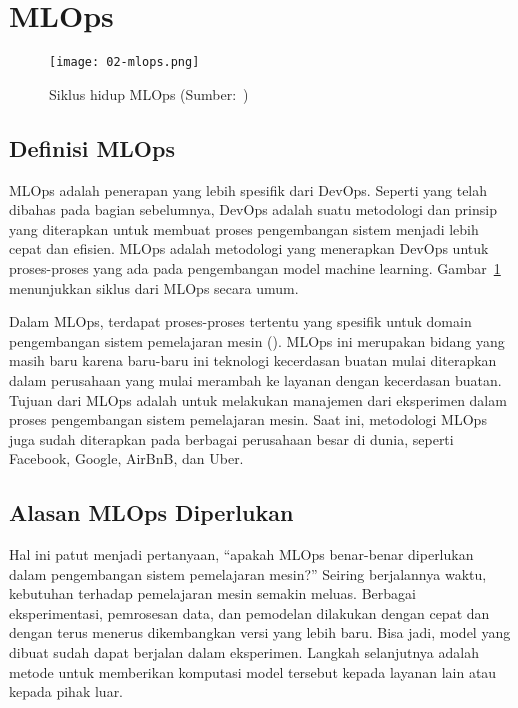 \section{MLOps}

\begin{figure}[ht]
  \vspace{\baselineskip}
  \centering
  \texttt{[image: 02-mlops.png]}
  \caption{Siklus hidup MLOps (Sumber:~\cite{mlops})}\label{fig:02-mlops-lifecycle}
\end{figure}

\subsection{Definisi MLOps}

MLOps adalah penerapan yang lebih spesifik dari DevOps. 
Seperti yang telah dibahas pada bagian sebelumnya, DevOps adalah suatu metodologi dan prinsip yang diterapkan untuk membuat proses pengembangan sistem menjadi lebih cepat dan efisien.
MLOps adalah metodologi yang menerapkan DevOps untuk proses-proses yang ada pada pengembangan model machine learning.
Gambar~\ref{fig:02-mlops-lifecycle} menunjukkan siklus dari MLOps secara umum.

Dalam MLOps, terdapat proses-proses tertentu yang spesifik untuk domain pengembangan sistem pemelajaran mesin (\cite{mlops}).\@
MLOps ini merupakan bidang yang masih baru karena baru-baru ini teknologi kecerdasan buatan mulai diterapkan dalam perusahaan yang mulai merambah ke layanan dengan kecerdasan buatan.
Tujuan dari MLOps adalah untuk melakukan manajemen dari eksperimen dalam proses pengembangan sistem pemelajaran mesin.
Saat ini, metodologi MLOps juga sudah diterapkan pada berbagai perusahaan besar di dunia, seperti Facebook, Google, AirBnB, dan Uber.

\subsection{Alasan MLOps Diperlukan}

Hal ini patut menjadi pertanyaan, ``apakah MLOps benar-benar diperlukan dalam pengembangan sistem pemelajaran mesin?''
Seiring berjalannya waktu, kebutuhan terhadap pemelajaran mesin semakin meluas.
Berbagai eksperimentasi, pemrosesan data, dan pemodelan dilakukan dengan cepat dan dengan terus menerus dikembangkan versi yang lebih baru.
Bisa jadi, model yang dibuat sudah dapat berjalan dalam eksperimen.
Langkah selanjutnya adalah metode untuk memberikan komputasi model tersebut kepada layanan lain atau kepada pihak luar.

